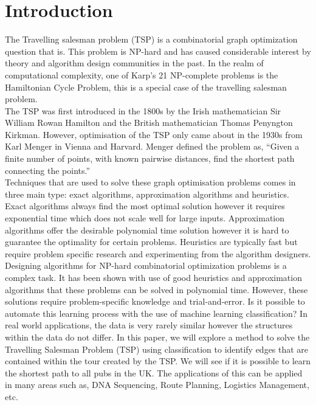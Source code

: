 \documentclass[]{UCD_CS_FYP_Report}
\begin{document}
\chapter{Introduction}
The Travelling salesman problem (TSP) is a combinatorial graph optimization question that is. This problem is NP-hard and has caused considerable interest by theory and algorithm design communities in the past. In the realm of computational complexity, one of Karp's 21 NP-complete problems is the Hamiltonian Cycle Problem, this is a special case of the travelling salesman problem.\\[0.2cm] 
The TSP was first introduced in the 1800s by the Irish mathematician Sir William Rowan Hamilton and the British mathematician Thomas Penyngton Kirkman. However, optimisation of the TSP only came about in the 1930s from Karl Menger in Vienna and Harvard. Menger defined the problem as, “Given a finite number of points, with known pairwise distances, find the shortest path connecting the points.”\cite{Menger}\\[0.2cm]
Techniques that are used to solve these graph optimisation problems comes in three main type: exact algorithms, approximation algorithms and heuristics. Exact algorithms always find the most optimal solution however it requires exponential time which does not scale well for large inputs. Approximation algorithms offer the desirable polynomial time solution however it is hard to guarantee the optimality for certain problems. Heuristics are typically fast but require problem specific research and experimenting from the algorithm designers.\\[0.2cm]
Designing algorithms for NP-hard combinatorial optimization problems is a complex task. It has been shown with use of good heuristics and approximation algorithms that these problems can be solved in polynomial time. However, these solutions require problem-specific knowledge and trial-and-error. Is it possible to automate this learning process with the use of machine learning classification? In real world applications, the data is very rarely similar however the structures within the data do not differ. In this paper, we will explore a method to solve the Travelling Salesman Problem (TSP) using classification to identify edges that are contained within the tour created by the TSP. We will see if it is possible to learn the shortest path to all pubs in the UK. The applications of this can be applied in many areas such as, DNA Sequencing, Route Planning, Logistics Management, etc.
\end{document}
